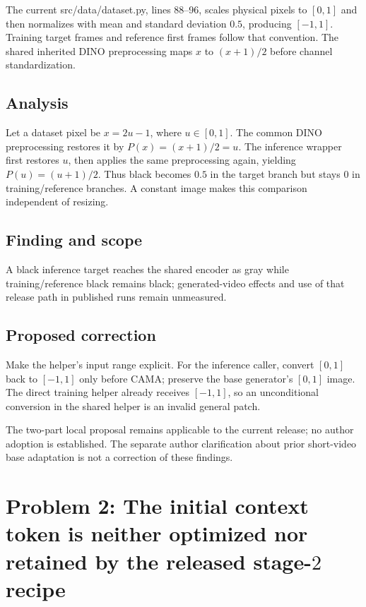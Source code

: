 \documentclass[11pt]{article}
\begin{document}
The current src/data/dataset.py, lines 88–96, scales physical pixels to \([0,1]\) and then normalizes with mean and standard deviation \(0.5\), producing \([-1,1]\). Training target frames and reference first frames follow that convention. The shared inherited DINO preprocessing maps \(x\) to \((x+1)/2\) before channel standardization.

\subsection*{Analysis}

Let a dataset pixel be \(x=2u-1\), where \(u\in[0,1]\). The common DINO preprocessing restores it by \(P(x)=(x+1)/2=u\). The inference wrapper first restores \(u\), then applies the same preprocessing again, yielding \(P(u)=(u+1)/2\). Thus black becomes \(0.5\) in the target branch but stays \(0\) in training/reference branches. A constant image makes this comparison independent of resizing.

\subsection*{Finding and scope}

A black inference target reaches the shared encoder as gray while training/reference black remains black; generated-video effects and use of that release path in published runs remain unmeasured.

\subsection*{Proposed correction}

Make the helper’s input range explicit. For the inference caller, convert \([0,1]\) back to \([-1,1]\) only before CAMA; preserve the base generator’s \([0,1]\) image. The direct training helper already receives \([-1,1]\), so an unconditional conversion in the shared helper is an invalid general patch.

The two-part local proposal remains applicable to the current release; no author adoption is established. The separate author clarification about prior short-video base adaptation is not a correction of these findings.

\section*{Problem 2: The initial context token is neither optimized nor retained by the released stage-\(2\) recipe}
\end{document}
